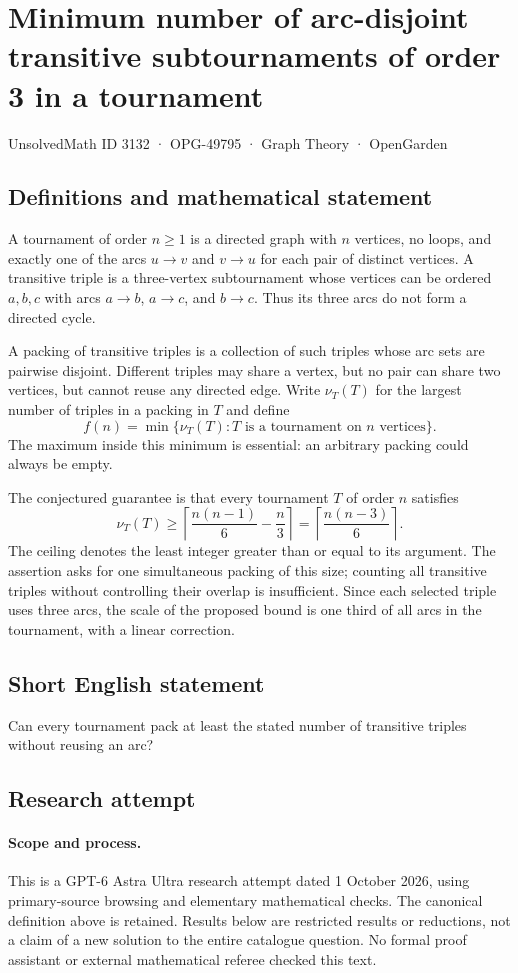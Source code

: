 \documentclass[11pt,a4paper]{article}
\begin{document}
\section*{Minimum number of arc-disjoint transitive subtournaments of order 3 in a tournament}\label{3132}
{\small UnsolvedMath ID 3132 · OPG-49795 · Graph Theory · OpenGarden}
\subsection{Definitions and mathematical statement}
A tournament of order $n\geq1$ is a directed graph with $n$ vertices,
no loops, and exactly one of the arcs $u\to v$ and $v\to u$ for each
pair of distinct vertices. A transitive triple is a three-vertex
subtournament whose vertices can be ordered $a,b,c$ with arcs
$a\to b$, $a\to c$, and $b\to c$. Thus its three arcs do not form
a directed cycle.

A packing of transitive triples is a collection of such triples whose
arc sets are pairwise disjoint. Different triples may share a vertex, but no pair can share
two vertices, but cannot reuse any directed edge. Write $\nu_T(T)$
for the largest number of triples in a packing in $T$ and define
\[
 f(n)=\min\{\nu_T(T):T\text{ is a tournament on }n\text{ vertices}\}.
\]
The maximum inside this minimum is essential: an arbitrary packing
could always be empty.

The conjectured guarantee is that every tournament $T$ of order $n$
satisfies
\[
 \nu_T(T)\geq
 \left\lceil\frac{n(n-1)}6-\frac n3\right\rceil
 =\left\lceil\frac{n(n-3)}6\right\rceil.
\]
The ceiling denotes the least integer greater than or equal to its
argument. The assertion asks for one simultaneous packing of this
size; counting all transitive triples without controlling their
overlap is insufficient. Since each selected triple uses three arcs,
the scale of the proposed bound is one third of all arcs in the
tournament, with a linear correction.
\subsection{Short English statement}
Can every tournament pack at least the stated number of transitive triples without reusing an arc?
\subsection{Research attempt}
\paragraph{Scope and process.}
This is a GPT-6 Astra Ultra research attempt dated 1 October 2026, using
primary-source browsing and elementary mathematical checks. The canonical
definition above is retained. Results below are restricted results or
reductions, not a claim of a new solution to the entire catalogue question.
No formal proof assistant or external mathematical referee checked this text.
\end{document}
